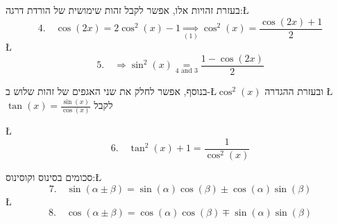\documentclass[english,hebrew]{article}
\begin{document}
בעזרת זהויות אלו, אפשר לקבל זהות שימושית של הורדת דרגה:\L{%
\[
4.\quad\cos\left(2x\right)=2\cos^{2}(x)-1\underset{(1)}{\Rightarrow}\cos^{2}(x)=\frac{\cos(2x)+1}{2}
\]
}%
\L{%
\[
5.\quad\Rightarrow\sin^{2}(x)\underset{4\text{ and }3}{=}\frac{1-\cos(2x)}{2}
\]
}%

בנוסף, אפשר לחלק את שני האגפים של זהות שלוש ב-\L{$\cos^{2}(x)$} ובעזרת
ההגדרה \L{$\tan(x)=\frac{\sin(x)}{\cos(x)}$} לקבל

\L{%
\[
6.\quad\tan^{2}(x)+1=\frac{1}{\cos^{2}(x)}
\]
}%

סכומים בסינוס וקוסינוס:\L{%
\[
7.\quad\sin(\alpha\pm\beta)=\sin(\alpha)\cos(\beta)\pm\cos(\alpha)\sin(\beta)
\]
}%
\L{%
\[
8.\quad\cos(\alpha\pm\beta)=\cos(\alpha)\cos(\beta)\mp\sin(\alpha)\sin(\beta)
\]
}%
\end{document}
